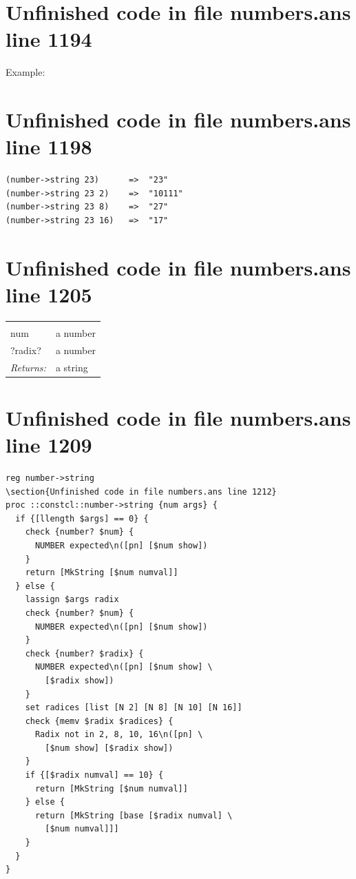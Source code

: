 \documentclass[twoside,9pt]{report}
\begin{document}
\section{Unfinished code in file numbers.ans line 1194}


Example:

\section{Unfinished code in file numbers.ans line 1198}
\begin{verbatim}
(number->string 23)      =>  "23"
(number->string 23 2)    =>  "10111"
(number->string 23 8)    =>  "27"
(number->string 23 16)   =>  "17"
\end{verbatim}
\section{Unfinished code in file numbers.ans line 1205}
\noindent\begin{tabular}{ |p{1.9cm} p{8cm}| }
\hline
\rowcolor[HTML]{CCCCCC} \multicolumn{2}{|l|}{\bf number->string (public)} \\
num & a number \\
?radix? & a number \\
\textit{Returns:} & a string \\
\hline
\end{tabular}
\section{Unfinished code in file numbers.ans line 1209}
\begin{lstlisting}
reg number->string
\section{Unfinished code in file numbers.ans line 1212}
proc ::constcl::number->string {num args} {
  if {[llength $args] == 0} {
    check {number? $num} {
      NUMBER expected\n([pn] [$num show])
    }
    return [MkString [$num numval]]
  } else {
    lassign $args radix
    check {number? $num} {
      NUMBER expected\n([pn] [$num show])
    }
    check {number? $radix} {
      NUMBER expected\n([pn] [$num show] \
        [$radix show])
    }
    set radices [list [N 2] [N 8] [N 10] [N 16]]
    check {memv $radix $radices} {
      Radix not in 2, 8, 10, 16\n([pn] \
        [$num show] [$radix show])
    }
    if {[$radix numval] == 10} {
      return [MkString [$num numval]]
    } else {
      return [MkString [base [$radix numval] \
        [$num numval]]]
    }
  }
}
\end{lstlisting}
\end{document}
